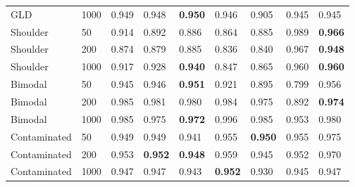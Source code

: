 \begin{tabular}{lllllllll}
GLD & 1000 & 0.949 & 0.948 & \textbf{0.950} & 0.946 & 0.905 & 0.945 & 0.945 \\
Shoulder & 50 & 0.914 & 0.892 & 0.886 & 0.864 & 0.885 & 0.989 & \textbf{0.966} \\
Shoulder & 200 & 0.874 & 0.879 & 0.885 & 0.836 & 0.840 & 0.967 & \textbf{0.948} \\
Shoulder & 1000 & 0.917 & 0.928 & \textbf{0.940} & 0.847 & 0.865 & 0.960 & \textbf{0.960} \\
Bimodal & 50 & 0.945 & 0.946 & \textbf{0.951} & 0.921 & 0.895 & 0.799 & 0.956 \\
Bimodal & 200 & 0.985 & 0.981 & 0.980 & 0.984 & 0.975 & 0.892 & \textbf{0.974} \\
Bimodal & 1000 & 0.985 & 0.975 & \textbf{0.972} & 0.996 & 0.985 & 0.953 & 0.980 \\
Contaminated & 50 & 0.949 & 0.949 & 0.941 & 0.955 & \textbf{0.950} & 0.955 & 0.975 \\
Contaminated & 200 & 0.953 & \textbf{0.952} & \textbf{0.948} & 0.959 & 0.945 & 0.952 & 0.970 \\
Contaminated & 1000 & 0.947 & 0.947 & 0.943 & \textbf{0.952} & 0.930 & 0.945 & 0.947 \\
\bottomrule
\end{tabular}
